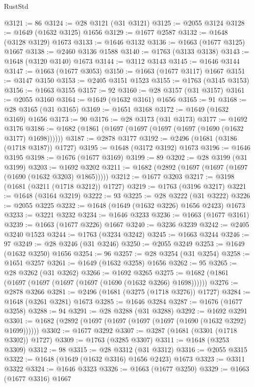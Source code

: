 \begin{lexlean}{RustStd}
\begin{coremodule}
@3121 := 86
@3124 := @28 @3121 (@31 @3121)
@3125 := @2055 @3124
@3128 := @1649 (@1632 @3125) @1656
@3129 := @1677 @2587
@3132 := @1648 (@3128 @3129) @1673
@3133 := @1646 @3132
@3136 := @1663 (@1677 @3125) @1667
@3138 := @2460 @3136 @1588
@3140 := @1763 (@3133 @3138)
@3143 := @1648 (@3120 @3140) @1673
@3144 := @3112 @3143
@3145 := @1646 @3144
@3147 := @1663 (@1677 @3053)
@3150 := @1663 (@1677 @3117) @1667
@3151 := @3147 @3150
@3153 := @2405 @3151 @1523
@3155 := @1763 (@3145 @3153)
@3156 := @1663 @3155
@3157 := 92
@3160 := @28 @3157 (@31 @3157)
@3161 := @2055 @3160
@3164 := @1649 (@1632 @3161) @1656
@3165 := 91
@3168 := @28 @3165 (@31 @3165)
@3169 := @1651 @3168
@3172 := @1649 (@1632 @3169) @1656
@3173 := 90
@3176 := @28 @3173 (@31 @3173)
@3177 := @1692 @3176
@3186 := @1682 (@1861 (@1697 (@1697 (@1697 (@1697 (@1690 (@1632 @3177) @1698))))))
@3187 := @2878 @3177
@3192 := @2496 (@1681 (@3186 (@1718 @3187)) @1727)
@3195 := @1648 (@3172 @3192) @1673
@3196 := @1646 @3195
@3198 := @1676 (@1677 @3169)
@3199 := 89
@3202 := @28 @3199 (@31 @3199)
@3203 := @1692 @3202
@3211 := @1682 (@2892 (@1697 (@1697 (@1697 (@1690 (@1632 @3203) @1865)))))
@3212 := @1677 @3203
@3217 := @3198 (@1681 (@3211 (@1718 @3212)) @1727)
@3219 := @1763 (@3196 @3217)
@3221 := @1648 (@3164 @3219)
@3222 := 93
@3225 := @28 @3222 (@31 @3222)
@3226 := @2055 @3225
@3232 := @1648 (@1649 (@1632 @3226) @1656 @2423) @1673
@3233 := @3221 @3232
@3234 := @1646 @3233
@3236 := @1663 (@1677 @3161)
@3239 := @1663 (@1677 @3226) @1667
@3240 := @3236 @3239
@3242 := @2405 @3240 @1523
@3244 := @1763 (@3234 @3242)
@3245 := @1663 @3244
@3246 := 97
@3249 := @28 @3246 (@31 @3246)
@3250 := @2055 @3249
@3253 := @1649 (@1632 @3250) @1656
@3254 := 96
@3257 := @28 @3254 (@31 @3254)
@3258 := @1651 @3257
@3261 := @1649 (@1632 @3258) @1656
@3262 := 95
@3265 := @28 @3262 (@31 @3262)
@3266 := @1692 @3265
@3275 := @1682 (@1861 (@1697 (@1697 (@1697 (@1697 (@1690 (@1632 @3266) @1698))))))
@3276 := @2878 @3266
@3281 := @2496 (@1681 (@3275 (@1718 @3276)) @1727)
@3284 := @1648 (@3261 @3281) @1673
@3285 := @1646 @3284
@3287 := @1676 (@1677 @3258)
@3288 := 94
@3291 := @28 @3288 (@31 @3288)
@3292 := @1692 @3291
@3301 := @1682 (@2892 (@1697 (@1697 (@1697 (@1697 (@1690 (@1632 @3292) @1699))))))
@3302 := @1677 @3292
@3307 := @3287 (@1681 (@3301 (@1718 @3302)) @1727)
@3309 := @1763 (@3285 @3307)
@3311 := @1648 (@3253 @3309)
@3312 := 98
@3315 := @28 @3312 (@31 @3312)
@3316 := @2055 @3315
@3322 := @1648 (@1649 (@1632 @3316) @1656 @2423) @1673
@3323 := @3311 @3322
@3324 := @1646 @3323
@3326 := @1663 (@1677 @3250)
@3329 := @1663 (@1677 @3316) @1667

\end{coremodule}
\end{lexlean}
